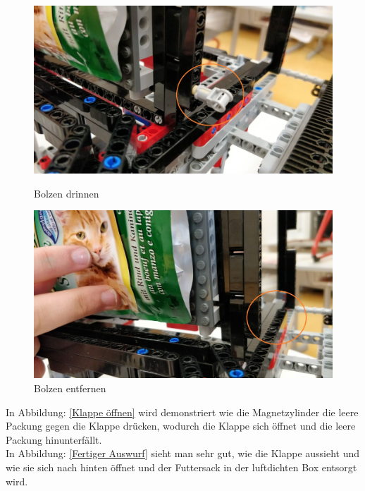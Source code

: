 \begin{figure}[H]
   \begin{minipage}[hbt]{0.5\textwidth} %
      \includegraphics[width=1\textwidth]{Bilder/Ablauf_1_png/Auswurf_2}
      \caption{Bolzen drinnen}
      \label{Bolzen drinnen}
   \end{minipage}
   \hspace{.04\linewidth}%
   \begin{minipage}[hbt]{0.5\textwidth} %
      \includegraphics[width=1\textwidth]{Bilder/Ablauf_1_png/Auswurf_3}
      \caption{Bolzen entfernen}
	  \label{Bolzen entfernen}      
      \end{minipage}
\end{figure}


In Abbildung: \ref{Klappe öffnen} wird demonstriert wie die Magnetzylinder die leere Packung gegen die Klappe drücken, wodurch die Klappe sich öffnet und die leere Packung hinunterfällt.\\

In Abbildung: \ref{Fertiger Auswurf} sieht man sehr gut, wie die Klappe aussieht und wie sie sich nach hinten öffnet und der Futtersack in der luftdichten Box entsorgt wird.


